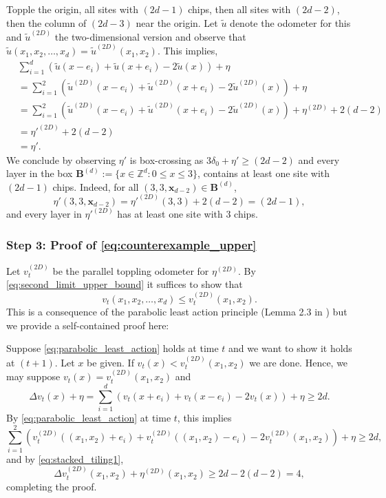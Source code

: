 \documentclass[aap]{imsart}
\newcommand{\Z}{\mathbb{Z}}
\begin{document}
Topple the origin, all sites with $(2d - 1)$ chips, then all sites with $(2d - 2)$, then the column of $(2 d-3)$ near the origin. Let $\tilde{u}$ denote the odometer for this and $\tilde{u}^{(2D)}$ the two-dimensional version and observe that $\tilde{u}(x_1, x_2, \ldots, x_d) = \tilde{u}^{(2D)}(x_1,x_2)$. This implies,
\begin{align*}
&\sum_{i=1}^{d} (\tilde{u}(x-e_i) + \tilde{u}(x+e_i) - 2 \tilde{u}(x)) + \eta \\
&= \sum_{i=1}^2 (\tilde{u}^{(2D)}(x-e_i) + \tilde{u}^{(2D)}(x+e_i) - 2 \tilde{u}^{(2D)}(x)) + \eta \\
&= \sum_{i=1}^2 (\tilde{u}^{(2D)}(x-e_i) + \tilde{u}^{(2D)}(x+e_i) - 2 \tilde{u}^{(2D)}(x)) + \eta^{(2D)} + 2  (d-2) \\
&= {\eta'}^{(2D)} + 2  (d-2) \\
&= \eta'. 
\end{align*}
We conclude by observing $\eta'$ is box-crossing as $3  \delta_0 + \eta' \geq (2 d - 2)$ and every layer in the box  $\mathbf{B}^{(d)} := \{ x \in \Z^d : 0 \leq x \leq 3 \}$, contains at least one site with $(2 d - 1)$ chips. Indeed, for all $(3, 3, \mathbf{x}_{d-2}) \in \mathbf{B}^{(d)}$, 
\[
\eta'(3,3, \mathbf{x}_{d-2}) = {\eta'}^{(2D)}(3, 3) + 2  (d - 2) = (2 d - 1),
\]
and every layer in ${\eta'}^{(2D)}$ has at least one site with 3 chips. 




\subsubsection*{Step 3: Proof of \eqref{eq:counterexample_upper}}
Let $v_t^{(2D)}$ be the parallel toppling odometer for $\eta^{(2D)}$. By \eqref{eq:second_limit_upper_bound}
it suffices to show that
\begin{equation} \label{eq:parabolic_least_action}
v_t(x_1, x_2, \ldots, x_d) \leq v_t^{(2D)}(x_1,x_2). 
\end{equation}
This is a consequence of the parabolic least action principle (Lemma 2.3 in \cite{bou2020dynamic}) but 
we provide a self-contained proof here:

Suppose \eqref{eq:parabolic_least_action} holds at time $t$ and we want to show it holds at $(t+1)$.
Let $x$ be given. If $v_t(x) < v_t^{(2D)}(x_1,x_2)$ we are done. Hence, we may suppose $v_t(x) = v_t^{(2D)}(x_1,x_2)$
and 
\[
\Delta v_t(x) + \eta = \sum_{i=1}^d (v_t(x + e_i) + v_t(x - e_i) - 2 v_t(x)) + \eta \geq 2 d.
\]
By \eqref{eq:parabolic_least_action} at time $t$, this implies 
\[
\sum_{i=1}^2 (v_t^{(2D)}((x_1,x_2) + e_i) + v_t^{(2D)}((x_1,x_2) - e_i) - 2 v_t^{(2D)}(x_1,x_2)) + \eta \geq 2 d,
\]
and by \eqref{eq:stacked_tiling1}, 
\[
\Delta v_t^{(2D)}(x_1,x_2) + \eta^{(2D)}(x_1,x_2) \geq 2 d - 2  (d - 2) = 4,
\]
completing the proof.
\end{document}
